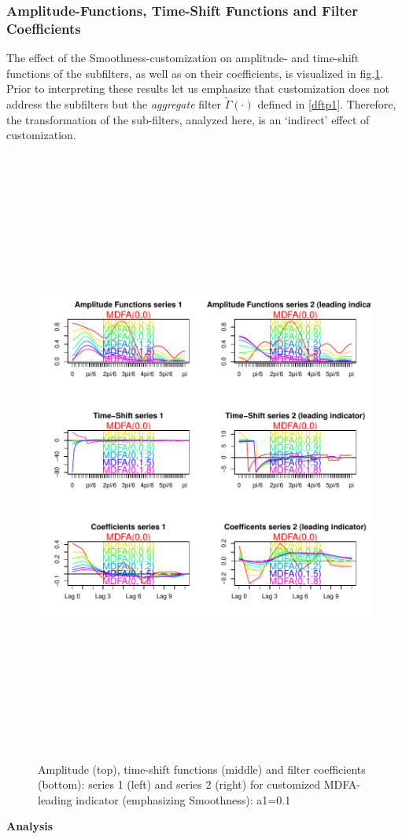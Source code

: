 \documentclass[a4paper]{book}
\begin{document}
\subsubsection{Amplitude-Functions, Time-Shift Functions and Filter Coefficients}

The effect of the Smoothness-customization on amplitude- and time-shift functions of the subfilters, as well as on their coefficients, is visualized in fig.\ref{z_amp_shift_mdfacust_leadind_S}. Prior to interpreting these results let us emphasize that customization does not address the subfilters but the \emph{aggregate} filter $\tilde{\Gamma}(\cdot)$ defined in \ref{dftp1}. Therefore, the transformation of the sub-filters, analyzed here, is an `indirect' effect of customization.

\begin{figure}[H]\begin{center}\includegraphics[height=8in, width=5in]{z_amp_shift_mdfacust_leadind_S}\caption{Amplitude (top), time-shift functions (middle) and filter coefficients (bottom): series 1 (left) and series 2 (right) for customized MDFA-leading indicator (emphasizing Smoothness): a1=0.1\label{z_amp_shift_mdfacust_leadind_S}}\end{center}\end{figure}\textbf{Analysis}
\end{document}
